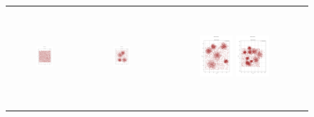 \begin{figure}[p]
\begin{tabular}{ccc}
        \includegraphics[height=36mm,width=0.24\textwidth]{Images/data/41.png}
        & \includegraphics[height=36mm,width=0.24\textwidth]{Images/data/42.png}
        & \includegraphics[height=36mm,width=0.24\textwidth]{Images/data/43.png}
        \includegraphics[height=36mm,width=0.24\textwidth]{Images/data/44.png}\\[-4pt]


\end{tabular}
\end{figure}
